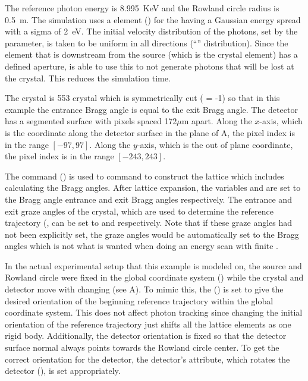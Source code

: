 The reference photon energy is 8.995~KeV and the Rowland circle radius is 0.5~m. The simulation uses
a  element () for the  having a Gaussian energy
spread with a sigma of 2~eV.  The initial velocity distribution of the photons, set by the
 parameter, is taken to be uniform in all directions (``''
distribution). Since the element that is downstream from the source (which is the crystal element)
has a defined aperture, \bmad is able to use this to not generate photons that will be lost at the
crystal. This reduces the simulation time.

The crystal is  553 crystal which is symmetrically cut ( = -1) so that in
this example the entrance Bragg angle is equal to the exit Bragg angle.  The detector has a
segmented surface with pixels spaced 172$\mu$m apart. Along the $x$-axis, which is the coordinate
along the detector surface in the plane of A, the pixel index is in the range $[-97,
97]$. Along the $y$-axis, which is the out of plane coordinate, the pixel index is in the range
$[-243,243]$.

The  command () is used to command \bmad to construct the
lattice which includes calculating the Bragg angles. After lattice expansion, the variables
 and  are set to the Bragg angle entrance and exit Bragg angles
respectively. The entrance and exit graze angles of the crystal, which are used to determine the
reference trajectory (, can be set to  and  respectively. Note that if these graze angles had not been explicitly set, the graze angles
would be automatically set to the Bragg angles which
is not what is wanted when doing an energy scan with finite .

In the actual experimental setup that this example is modeled on, the source and Rowland circle were
fixed in the global coordinate system () while the crystal and detector move with
changing  (see A). To mimic this, the 
() is set to give the desired orientation of the beginning reference trajectory
within the global coordinate system. This does not affect photon tracking since changing the initial
orientation of the reference trajectory just shifts all the lattice elements as one rigid
body. Additionally, the detector orientation is fixed so that the detector surface normal always
points towards the Rowland circle center. To get the correct orientation for the detector, the
detector's  attribute, which rotates the detector (), is set appropriately.


